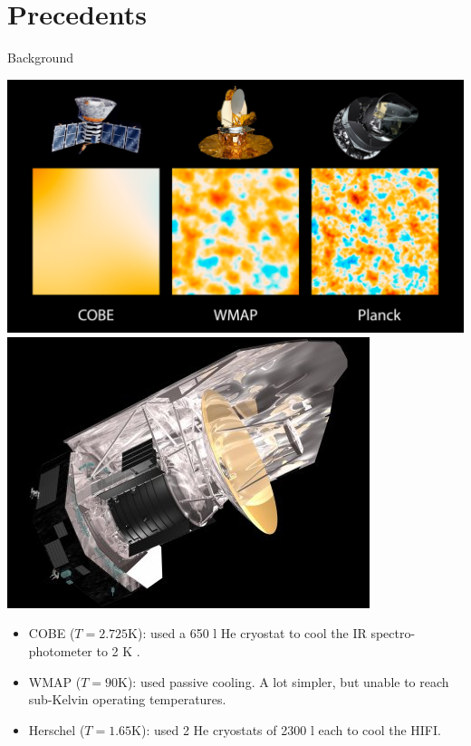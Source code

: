 \documentclass{cubeamer}
\begin{document}
\section{Precedents}
\begin{frame}{Background}

    \begin{minipage}{0.4\textwidth}
    \includegraphics[width=0.9\linewidth]{Figures/planck3.jpg} \\
    \includegraphics[width=0.9\linewidth]{Figures/herschel.jpg}
    \end{minipage}
    \begin{minipage}{0.55\textwidth}

   
         \begin{itemize}
         \item COBE ($T=2.725 \text{K}$): used a 650 l He cryostat to cool the IR spectro-photometer to 2 K .
         \item WMAP ($T=90 \text{K}$): used passive cooling. A lot simpler, but unable to reach sub-Kelvin operating temperatures.
         \item Herschel ($T=1.65 \text{K}$):  used 2 He cryostats of 2300 l each to cool the HIFI.

         \end{itemize}
    \end{minipage}
\end{frame}
\end{document}
